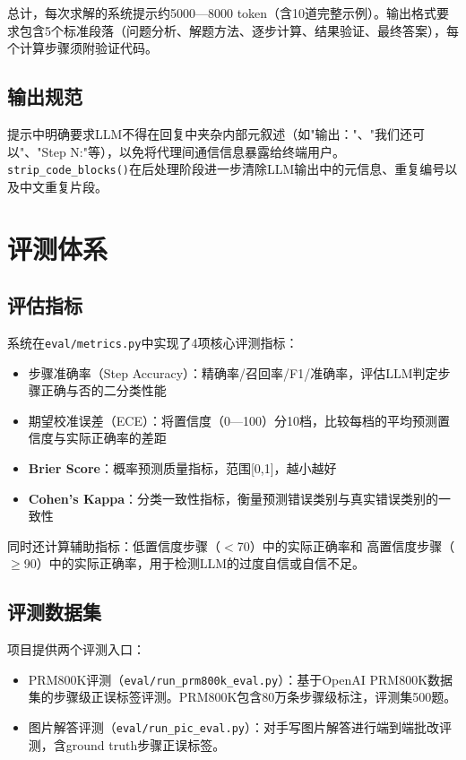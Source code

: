 \documentclass[12pt,a4paper]{ctexart}
\begin{document}
总计，每次求解的系统提示约5000—8000 token（含10道完整示例）。输出格式要求包含5个标准段落（问题分析、解题方法、逐步计算、结果验证、最终答案），每个计算步骤须附验证代码。

\subsection{输出规范}

提示中明确要求LLM不得在回复中夹杂内部元叙述（如"输出："、"我们还可以"、"Step N:"等），以免将代理间通信信息暴露给终端用户。\verb|strip_code_blocks()|在后处理阶段进一步清除LLM输出中的元信息、重复编号以及中文重复片段。

\section{评测体系}

\subsection{评估指标}

系统在\verb|eval/metrics.py|中实现了4项核心评测指标：

\begin{itemize}[nosep]
  \item 步骤准确率（Step Accuracy）：精确率/召回率/F1/准确率，评估LLM判定步骤正确与否的二分类性能
  \item 期望校准误差（ECE）：将置信度（0—100）分10档，比较每档的平均预测置信度与实际正确率的差距
  \item \textbf{Brier Score}：概率预测质量指标，范围[0,1]，越小越好
  \item \textbf{Cohen's Kappa}：分类一致性指标，衡量预测错误类别与真实错误类别的一致性
\end{itemize}

同时还计算辅助指标：低置信度步骤（$<$70）中的实际正确率和 高置信度步骤（$\geq$90）中的实际正确率，用于检测LLM的过度自信或自信不足。

\subsection{评测数据集}

项目提供两个评测入口：

\begin{itemize}[nosep]
  \item PRM800K评测（\verb|eval/run_prm800k_eval.py|）：基于OpenAI PRM800K数据集的步骤级正误标签评测。PRM800K包含80万条步骤级标注，评测集500题。
  \item 图片解答评测（\verb|eval/run_pic_eval.py|）：对手写图片解答进行端到端批改评测，含ground truth步骤正误标签。
\end{itemize}
\end{document}
